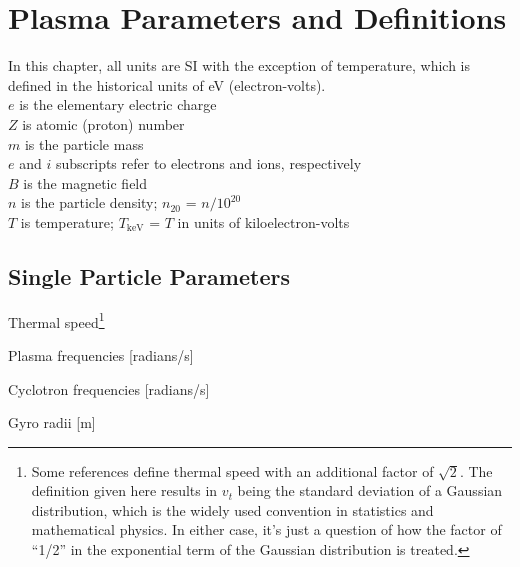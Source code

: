 \chapter{Plasma Parameters and Definitions}
In this chapter, all units are SI with the exception of temperature,
which is defined in the historical units of eV (electron-volts).\\

\noindent
$e$ is the elementary electric charge\\
$Z$ is atomic (proton) number\\
$m$ is the particle mass\\
$e$ and $i$ subscripts refer to electrons and ions, respectively\\
$B$ is the magnetic field\\
$n$ is the particle density; $n_{20}$ = $n/10^{20}$\\
$T$ is temperature; $T_\mathrm{keV}$ = $T$ in units of kiloelectron-volts\\


\section{Single Particle Parameters}

\noindent
Thermal speed\footnote{Some references define thermal speed with an
  additional factor of $\sqrt{2}$. The definition given here results
  in $v_t$ being the standard deviation of a Gaussian distribution,
  which is the widely used convention in statistics and mathematical
  physics. In either case, it's just a question of how the factor of
  ``1/2'' in the exponential term of the Gaussian distribution is
  treated.}



\noindent
Plasma frequencies [radians/s] 

\noindent
Cyclotron frequencies [radians/s] 

\noindent
Gyro radii [m] 

